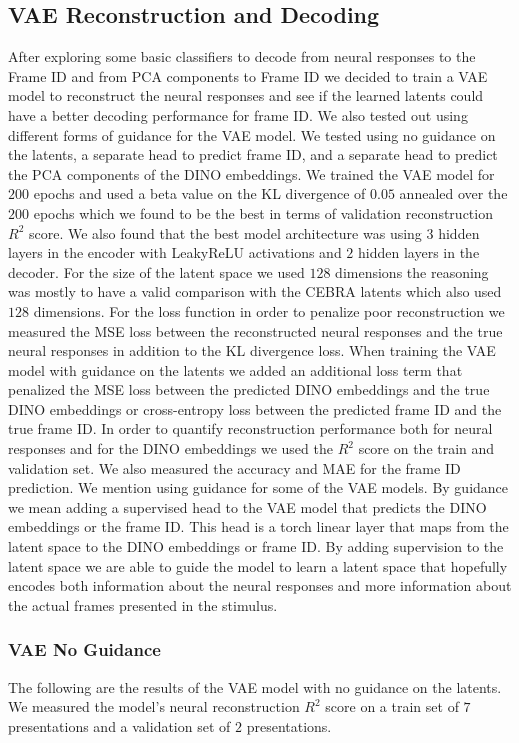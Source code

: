 \documentclass[12pt, letterpaper]{article}
\begin{document}
\subsection{VAE Reconstruction and Decoding}
\label{subsec:vae_reconstruction_and_decoding}
After exploring some basic classifiers to decode from neural responses to the Frame ID and from PCA components to Frame ID we decided to train a VAE model to reconstruct the neural responses and see if the learned latents could have a better decoding performance for frame ID. We also tested out using different forms of guidance for the VAE model. We tested using no guidance on the latents, a separate head to predict frame ID, and a separate head to predict the PCA components of the DINO embeddings. We trained the VAE model for $200$ epochs and used a beta value on the KL divergence of $0.05$ annealed over the $200$ epochs which we found to be the best in terms of validation reconstruction $R^2$ score. We also found that the best model architecture was using $3$ hidden layers in the encoder with LeakyReLU activations and $2$ hidden layers in the decoder. 
For the size of the latent space we used $128$ dimensions the reasoning was mostly to have a valid comparison with the CEBRA \cite{schneider2023} latents which also used $128$ dimensions. For the loss function in order to penalize poor reconstruction we measured the MSE loss between the reconstructed neural responses and the true neural responses in addition to the KL divergence loss. When training the VAE model with guidance on the latents we added an additional loss term that penalized the MSE loss between the predicted DINO embeddings and the true DINO embeddings or cross-entropy loss between the predicted frame ID and the true frame ID. In order to quantify reconstruction performance both for neural responses and for the DINO embeddings we used the $R^2$ score on the train and validation set. We also measured the accuracy and MAE for the frame ID prediction.
We mention using guidance for some of the VAE models. By guidance we mean adding a supervised head to the VAE model that predicts the DINO embeddings or the frame ID. This head is a torch linear layer that maps from the latent space to the DINO embeddings or frame ID. By adding supervision to the latent space we are able to guide the model to learn a latent space that hopefully encodes both information about the neural responses and more information about the actual frames presented in the stimulus.

\subsubsection{VAE No Guidance}
\label{subsubsec:vae_no_guidance}
The following are the results of the VAE model with no guidance on the latents. We measured the model's neural reconstruction $R^2$ score on a train set of $7$ presentations and a validation set of $2$ presentations.
\end{document}
